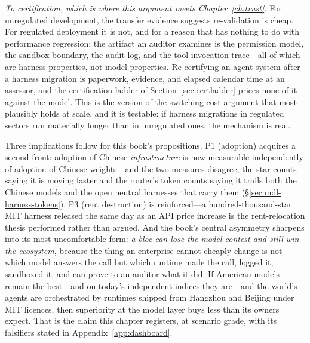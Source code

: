 \emph{To certification, which is where this argument meets Chapter~\ref{ch:trust}.} For unregulated development, the transfer evidence suggests re-validation is cheap. For regulated deployment it is not, and for a reason that has nothing to do with performance regression: the artifact an auditor examines is the permission model, the sandbox boundary, the audit log, and the tool-invocation trace---all of which are harness properties, not model properties. Re-certifying an agent system after a harness migration is paperwork, evidence, and elapsed calendar time at an assessor, and the certification ladder of Section~\ref{sec:certladder} prices none of it against the model. This is the version of the switching-cost argument that most plausibly holds at scale, and it is testable: if harness migrations in regulated sectors run materially longer than in unregulated ones, the mechanism is real.

Three implications follow for this book's propositions. P1 (adoption) acquires a second front: adoption of Chinese \emph{infrastructure} is now measurable independently of adoption of Chinese weights---and the two measures disagree, the star counts saying it is moving faster and the router's token counts saying it trails both the Chinese models and the open neutral harnesses that carry them (\S\ref{sec:mdl-harness-tokens}). P3 (rent destruction) is reinforced---a hundred-thousand-star MIT harness released the same day as an API price increase is the rent-relocation thesis performed rather than argued. And the book's central asymmetry sharpens into its most uncomfortable form: \emph{a bloc can lose the model contest and still win the ecosystem}, because the thing an enterprise cannot cheaply change is not which model answers the call but which runtime made the call, logged it, sandboxed it, and can prove to an auditor what it did. If American models remain the best---and on today's independent indices they are---and the world's agents are orchestrated by runtimes shipped from Hangzhou and Beijing under MIT licences, then superiority at the model layer buys less than its owners expect. That is the claim this chapter registers, at scenario grade, with its falsifiers stated in Appendix~\ref{app:dashboard}.
